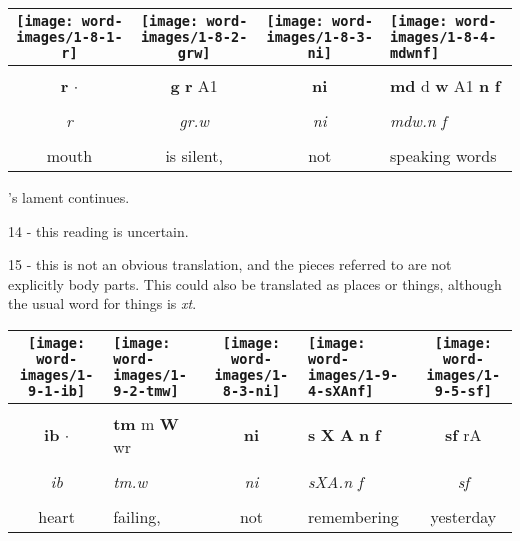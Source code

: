 \vspace{7.5mm}

\begin{tabularx}{\linewidth}{cccY}
	\texttt{[image: word-images/1-8-1-r]} &
	\texttt{[image: word-images/1-8-2-grw]} &
	\texttt{[image: word-images/1-8-3-ni]} &
	\texttt{[image: word-images/1-8-4-mdwnf]} \\
	\hline \\ 
	\textbf{r} $\cdot$ &
	\textbf{g} \textbf{r} A1 &
	\textbf{ni} &
	\textbf{md} d \textbf{w} A1 \textbf{n} \textbf{f} \\
	\hline \\ 
	\textit{r} & \textit{gr.w} & \textit{ni} & \textit{mdw.n f} \\
	\hline \\ 
	mouth & is silent, & not & speaking words
\end{tabularx}

\vspace*{\fill}

\pagebreak

\vspace*{\fill}

's lament continues.

\vspace*{\fill}

14 - this reading is uncertain.

15 - this is not an obvious translation, and the pieces referred to are not explicitly body parts. This could also be translated as places or things, although the usual word for things is \textit{xt}.

\vspace*{\fill}

\pagebreak

\vspace*{\fill}

\begin{tabularx}{\linewidth}{cYcYc}
	\texttt{[image: word-images/1-9-1-ib]} &
	\texttt{[image: word-images/1-9-2-tmw]} &
	\hspace{4mm}\texttt{[image: word-images/1-8-3-ni]} &
	\texttt{[image: word-images/1-9-4-sXAnf]} &
	\texttt{[image: word-images/1-9-5-sf]} \\
	\hline \\ 
	\textbf{ib} $\cdot$ &
	\textbf{tm} m \textbf{W} wr &
	\hspace{4mm}\textbf{ni} &
	\textbf{s} \textbf{X} \textbf{A} \textbf{n} \textbf{f} &
	\textbf{sf} rA \\
	\hline \\ 
	\textit{ib} & \textit{tm.w} & \hspace{4mm}\textit{ni} & \textit{sXA.n f} & \textit{sf} \\
	\hline \\ 
	heart & failing, & \hspace{3mm}not & remembering & yesterday
\end{tabularx}

